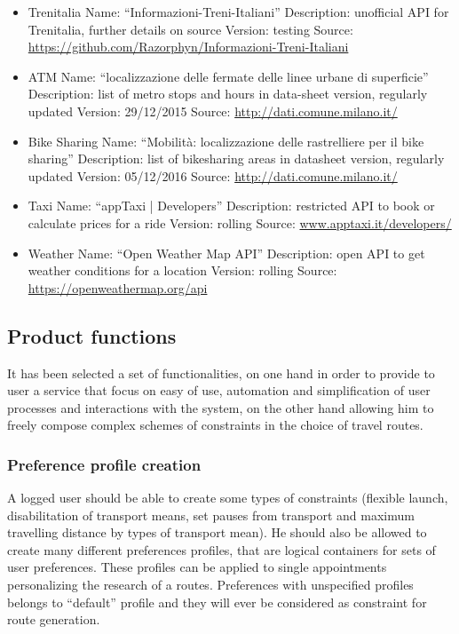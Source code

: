 \begin{itemize}
	\item Trenitalia
	\subitem Name: “Informazioni-Treni-Italiani”
	\subitem Description: unofficial API for Trenitalia, further details on source
	\subitem Version: testing
	\subitem Source: \url{https://github.com/Razorphyn/Informazioni-Treni-Italiani}
	
	\item ATM
	\subitem Name: “localizzazione delle fermate delle linee urbane di superficie”
	\subitem Description: list of metro stops and hours in data-sheet version, regularly updated
	\subitem Version: 29/12/2015
	\subitem Source: \url{http://dati.comune.milano.it/}
	
	\item Bike Sharing
	\subitem Name: “Mobilità: localizzazione delle rastrelliere per il bike sharing”
	\subitem Description: list of bikesharing areas in datasheet version, regularly updated
	\subitem Version: 05/12/2016
	\subitem Source: \url{http://dati.comune.milano.it/}
	
	\item Taxi
	\subitem Name: “appTaxi | Developers”
	\subitem Description: restricted API to book or calculate prices for a ride
	\subitem Version: rolling
	\subitem Source: \url{www.apptaxi.it/developers/}
	
	\item Weather
	\subitem Name: “Open Weather Map API”
	\subitem Description: open API to get weather conditions for a location
	\subitem Version: rolling
	\subitem Source: \url{https://openweathermap.org/api}
	
\end{itemize}
\subsection{Product functions}

It has been selected a set of functionalities, on one hand in order to provide to user a service that focus on easy of use, automation and simplification of user processes and interactions with the system, on the other hand allowing him to freely compose complex schemes of constraints in the choice of travel routes.

\subsubsection{Preference profile creation}
A logged user should be able to create some types of constraints (flexible launch, disabilitation of transport means, set pauses from transport and maximum travelling distance by types of transport mean). He should also be allowed to create many different preferences profiles, that are logical containers for sets of user preferences. These profiles can be applied to single appointments personalizing the research of a routes. Preferences with unspecified profiles belongs to “default” profile and they will ever be considered as constraint for route generation.

